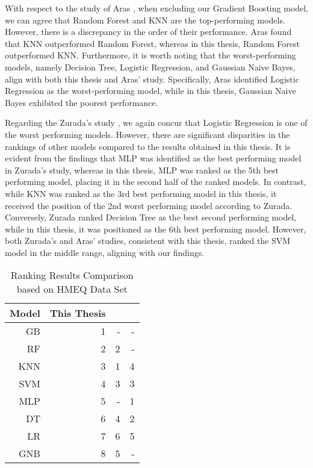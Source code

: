 With respect to the study of Aras \citep{serkan2021bagging}, when excluding our Gradient Boosting model, we can agree that Random Forest and KNN are the top-performing models. However, there is a discrepancy in the order of their performance. Aras found that KNN outperformed Random Forest, whereas in this thesis, Random Forest outperformed KNN.
Furthermore, it is worth noting that the worst-performing models, namely Decision Tree, Logistic Regression, and Gaussian Naive Bayes, align with both this thesis and Aras' study. Specifically, Aras identified Logistic Regression as the worst-performing model, while in this thesis, Gaussian Naive Bayes exhibited the poorest performance.

Regarding the Zurada's study \citep{zurada2014classification}, we again concur that Logistic Regression is one of the worst performing models.
However, there are significant disparities in the rankings of other models compared to the results obtained in this thesis.
It is evident from the findings that MLP was identified as the best performing model in Zurada's study, whereas in this thesis, MLP was ranked as the 5th best performing model, placing it in the second half of the ranked models.
In contrast, while KNN was ranked as the 3rd best performing model in this thesis, it received the position of the 2nd worst performing model according to Zurada.
Conversely, Zurada ranked Decision Tree as the best second performing model, while in this thesis, it was positioned as the 6th best performing model.
However, both Zurada's and Aras' studies, consistent with this thesis, ranked the SVM model in the middle range, aligning with our findings.
\begin{table}[H]
    \small
    \setlength{\tabcolsep}{8pt}
    \renewcommand{\arraystretch}{1.3}
    \centering
        \caption[Ranking Results Comparison based on HMEQ Data Set]{Ranking Results Comparison based on HMEQ Data Set}\label{tab:comparisonfinal}
        \begin{tabular}{r r r r}
    \toprule
    \textbf{Model} & \textbf{This Thesis} & \textbf{\citep{serkan2021bagging}} & \textbf{\citep{zurada2014classification}}\\
    \midrule
    \hline
    GB & 1 & - & - \\ 
    RF & 2 & 2 & - \\ 
    KNN & 3 & 1 & 4 \\ 
    SVM & 4 & 3 & 3 \\ 
    MLP & 5 & - & 1 \\ 
    DT & 6 & 4 & 2 \\ 
    LR & 7 & 6 & 5 \\
    GNB & 8 & 5 & - \\
    \hline
    \bottomrule
    \end{tabular}
    \vspace{0.35em}

        \vspace{-1em}
\end{table}

